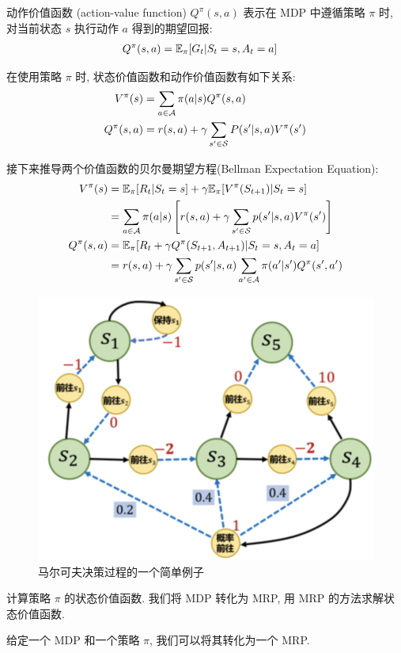 \begin{definition}[动作价值函数]
    动作价值函数 (action-value function) $Q^\pi(s,a)$ 表示在 MDP 中遵循策略 $\pi$ 时, 对当前状态 $s$ 执行动作 $a$ 得到的期望回报:
    \begin{align*}
        Q^\pi(s,a)&=\mathbb{E}_\pi [G_t | S_t =s, A_t = a]
    \end{align*}
\end{definition}

在使用策略 $\pi$ 时, 状态价值函数和动作价值函数有如下关系:
\begin{align*}
    V^\pi(s) &= \sum_{a\in\mathcal{A}} \pi(a|s) Q^\pi(s,a)\\
    Q^\pi(s,a) &= r(s,a) + \gamma \sum_{s'\in\mathcal{S}}P(s'|s,a)V^\pi(s')
\end{align*}

接下来推导两个价值函数的贝尔曼期望方程(Bellman Expectation Equation):
\begin{align*}
    V^\pi(s) &= \mathbb{E}_\pi [R_t | S_t = s]  + \gamma \mathbb{E}_\pi [ V^\pi(S_{t+1}) | S_t = s]\\ 
    &= \sum_{a\in\mathcal{A}}\pi(a|s) \left[ r(s,a) + \gamma \sum_{s'\in\mathcal{S}} p(s'|s, a)V^\pi(s') \right]\\
    Q^\pi(s,a) &= \mathbb{E}_\pi [R_t +\gamma Q^\pi(S_{t+1}, A_{t+1}) | S_t = s, A_t=a]\\ 
    &=r(s,a) + \gamma \sum_{s'\in\mathcal{S}} p(s'|s,a)\sum_{a'\in\mathcal{A}}\pi(a'|s')Q^\pi(s', a')
\end{align*}

\begin{figure}[!htb]
    \centering
    \includegraphics[width=0.618\linewidth]{pic/RL3/马尔可夫决策过程的一个简单例子.png}
    \caption{马尔可夫决策过程的一个简单例子}
\end{figure}


计算策略 $\pi$ 的状态价值函数. 我们将 MDP 转化为 MRP, 用 MRP 的方法求解状态价值函数. 
\begin{theorem}
    给定一个 MDP 和一个策略 $\pi$, 我们可以将其转化为一个 MRP.
\end{theorem}

